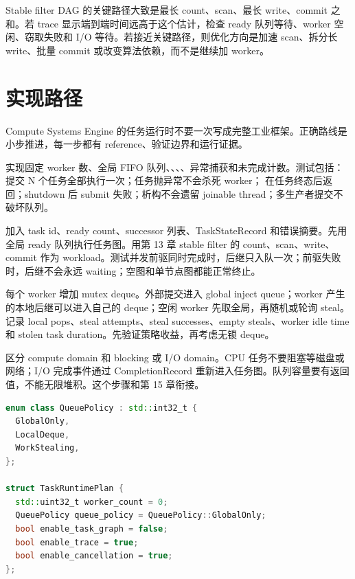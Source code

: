 Stable filter DAG 的关键路径大致是最长 count、scan、最长 write、commit 之和。若 trace 显示端到端时间远高于这个估计，检查 ready 队列等待、worker 空闲、窃取失败和 I/O 等待。若接近关键路径，则优化方向是加速 scan、拆分长 write、批量 commit 或改变算法依赖，而不是继续加 worker。

\section{实现路径}

Compute Systems Engine 的任务运行时不要一次写成完整工业框架。正确路线是小步推进，每一步都有 reference、验证边界和运行证据。

实现固定 worker 数、全局 FIFO 队列、、、、异常捕获和未完成计数。测试包括：提交 N 个任务全部执行一次；任务抛异常不会杀死 worker； 在任务终态后返回；shutdown 后 submit 失败；析构不会遗留 joinable thread；多生产者提交不破坏队列。

加入 task id、ready count、successor 列表、TaskStateRecord 和错误摘要。先用全局 ready 队列执行任务图。用第 13 章 stable filter 的 count、scan、write、commit 作为 workload。测试并发前驱同时完成时，后继只入队一次；前驱失败时，后继不会永远 waiting；空图和单节点图都能正常终止。

每个 worker 增加 mutex deque。外部提交进入 global inject queue；worker 产生的本地后继可以进入自己的 deque；空闲 worker 先取全局，再随机或轮询 steal。记录 local pops、steal attempts、steal successes、empty steals、worker idle time 和 stolen task duration。先验证策略收益，再考虑无锁 deque。

区分 compute domain 和 blocking 或 I/O domain。CPU 任务不要阻塞等磁盘或网络；I/O 完成事件通过 CompletionRecord 重新进入任务图。队列容量要有返回值，不能无限堆积。这个步骤和第 15 章衔接。

\begin{lstlisting}[language=C++,caption={项目中 TaskRuntimePlan 的接口草图}]
enum class QueuePolicy : std::int32_t {
  GlobalOnly,
  LocalDeque,
  WorkStealing,
};

struct TaskRuntimePlan {
  std::uint32_t worker_count = 0;
  QueuePolicy queue_policy = QueuePolicy::GlobalOnly;
  bool enable_task_graph = false;
  bool enable_trace = true;
  bool enable_cancellation = true;
};
\end{lstlisting}

